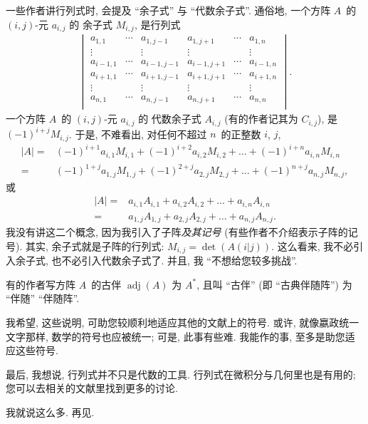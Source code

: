 一些作者讲行列式时, 会提及 ``余子式'' 与
``代数余子式''.
通俗地, 一个方阵 \(A\)~的 \((i, j)\)-元
\(a_{i,j}\) 的%
余子式 \(M_{i,j}\),
是行列式
\begin{align*}
    \begin{vmatrix}
        a_{1,1}     & \cdots & a_{1,j-1}   &
        a_{1,j+1}   & \cdots & a_{1,n}       \\
        \vdots      & {}     & \vdots      &
        \vdots      & {}     & \vdots        \\
        a_{i-1,1}   & \cdots & a_{i-1,j-1} &
        a_{i-1,j+1} & \cdots & a_{i-1,n}     \\
        a_{i+1,1}   & \cdots & a_{i+1,j-1} &
        a_{i+1,j+1} & \cdots & a_{i+1,n}     \\
        \vdots      & {}     & \vdots      &
        \vdots      & {}     & \vdots        \\
        a_{n,1}     & \cdots & a_{n,j-1}   &
        a_{n,j+1}   & \cdots & a_{n,n}       \\
    \end{vmatrix}.
\end{align*}
一个方阵 \(A\)~的 \((i, j)\)-元
\(a_{i,j}\) 的%
代数余子式 \(A_{i,j}\)
(有的作者记其为 \(C_{i,j}\)),
是
\((-1)^{i+j} M_{i,j}\).
于是, 不难看出,
对任何不超过 \(n\)~的正整数 \(i\), \(j\),
\begin{align*}
    |A|
    = {} &
    (-1)^{i+1} a_{i,1} M_{i,1}
    + (-1)^{i+2} a_{i,2} M_{i,2}
    + \dots
    + (-1)^{i+n} a_{i,n} M_{i,n}
    \\
    = {} &
    (-1)^{1+j} a_{1,j} M_{1,j}
    + (-1)^{2+j} a_{2,j} M_{2,j}
    + \dots
    + (-1)^{n+j} a_{n,j} M_{n,j},
\end{align*}
或
\begin{align*}
    |A|
    = {} &
    a_{i,1} A_{i,1}
    + a_{i,2} A_{i,2}
    + \dots
    + a_{i,n} A_{i,n}
    \\
    = {} &
    a_{1,j} A_{1,j}
    + a_{2,j} A_{2,j}
    + \dots
    + a_{n,j} A_{n,j}.
\end{align*}
我没有讲这二个概念,
因为我引入了子阵\emph{及其记号}
(有些作者不介绍表示子阵的记号).
其实,
余子式就是子阵的行列式:
\(
M_{i,j} = \det {(A(i|j))}
\).
这么看来, 我不必引入余子式,
也不必引入代数余子式了.
并且, 我 ``不想给您较多挑战''.

有的作者写方阵 \(A\)~的古伴
\(\operatorname{adj} {(A)}\)
为 \(A^{\ast}\),
且叫 ``古伴'' (即 ``古典伴随阵'')
为 ``伴随'' ``伴随阵''.

我希望, 这些说明,
可助您较顺利地适应其他的文献上的符号.
或许, 就像嬴政统一文字那样,
数学的符号也应被统一;
可是, 此事有些难.
我能作的事, 至多是助您适应这些符号.

最后, 我想说,
行列式并不只是代数的工具.
行列式在微积分与几何里也是有用的;
您可以去相关的文献里找到更多的讨论.

我就说这么多.
再见.

